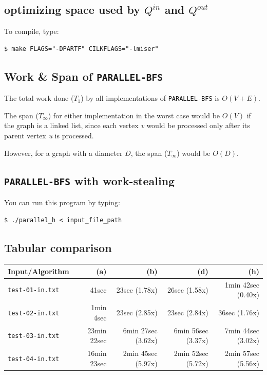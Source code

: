 \documentclass{article}
\begin{document}
\subsection{optimizing space used by $Q^{in}$ and $Q^{out}$}

To compile, type:
\begin{verbatim}
$ make FLAGS="-DPARTF" CILKFLAGS="-lmiser"
\end{verbatim}

\subsection{Work \& Span of \texttt{PARALLEL-BFS}}

The total work done ($T_1$) by all implementations of
\texttt{PARALLEL-BFS} is $O(V + E)$.

The span ($T_\infty$) for either implementation in the worst case
would be $O(V)$ if the graph is a linked list, since each vertex
\textit{v} would be processed only after its parent vertex \textit{u}
is processed.

However, for a graph with a diameter $D$, the span ($T_\infty$) would
be $O(D)$.

\subsection{\texttt{PARALLEL-BFS} with work-stealing}

You can run this program by typing:
\begin{verbatim}
$ ./parallel_h < input_file_path
\end{verbatim}

\subsection{Tabular comparison}

\begin{center}
  \begin{tabular}{| l | r | r | r | r |}
    \hline
    Input/Algorithm & (a) & (b) & (d) & (h) \\ \hline
    \texttt{test-01-in.txt} & 41sec & 23sec (1.78x) & 26sec (1.58x) & 1min 42sec (0.40x) \\ \hline
    \texttt{test-02-in.txt} & 1min 4sec & 23sec (2.85x) & 23sec (2.84x) & 36sec (1.76x) \\ \hline
    \texttt{test-03-in.txt} & 23min 22sec & 6min 27sec (3.62x) & 6min 56sec (3.37x) & 7min 44sec (3.02x) \\ \hline
    \texttt{test-04-in.txt} & 16min 23sec & 2min 45sec (5.97x) & 2min 52sec (5.72x) & 2min 57sec (5.56x) \\
    \hline
  \end{tabular}
\end{center}
\end{document}
